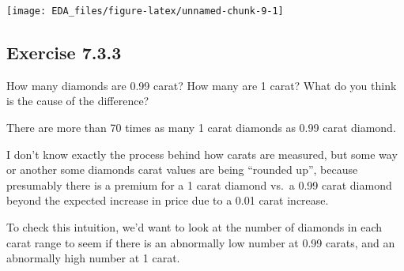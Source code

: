 \documentclass[]{book}
\newenvironment{Shaded}{\begin{snugshade}}{\end{snugshade}}
\newcommand{\CommentTok}[1]{\textcolor[rgb]{0.56,0.35,0.01}{\textit{#1}}}
\newcommand{\DecValTok}[1]{\textcolor[rgb]{0.00,0.00,0.81}{#1}}
\newcommand{\FloatTok}[1]{\textcolor[rgb]{0.00,0.00,0.81}{#1}}
\newcommand{\KeywordTok}[1]{\textcolor[rgb]{0.13,0.29,0.53}{\textbf{#1}}}
\newcommand{\NormalTok}[1]{#1}
\newcommand{\OperatorTok}[1]{\textcolor[rgb]{0.81,0.36,0.00}{\textbf{#1}}}
\newcommand{\StringTok}[1]{\textcolor[rgb]{0.31,0.60,0.02}{#1}}
\theoremstyle{plain}
\theoremstyle{remark}
\theoremstyle{definition}
\theoremstyle{definition}
\theoremstyle{definition}
\theoremstyle{remark}
\begin{document}
\begin{center}\texttt{[image: EDA\_files/figure-latex/unnamed-chunk-9-1]} \end{center}

\hypertarget{exercise-7.3.3}{%
\subsection*{\texorpdfstring{Exercise
{7.3.3}}{Exercise 7.3.3}}\label{exercise-7.3.3}}

How many diamonds are 0.99 carat? How many are 1 carat? What do you
think is the cause of the difference?

There are more than 70 times as many 1 carat diamonds as 0.99 carat
diamond.

\begin{Shaded}
\end{Shaded}

I don't know exactly the process behind how carats are measured, but
some way or another some diamonds carat values are being ``rounded up'',
because presumably there is a premium for a 1 carat diamond vs.~a 0.99
carat diamond beyond the expected increase in price due to a 0.01 carat
increase.

To check this intuition, we'd want to look at the number of diamonds in
each carat range to seem if there is an abnormally low number at 0.99
carats, and an abnormally high number at 1 carat.
\end{document}
